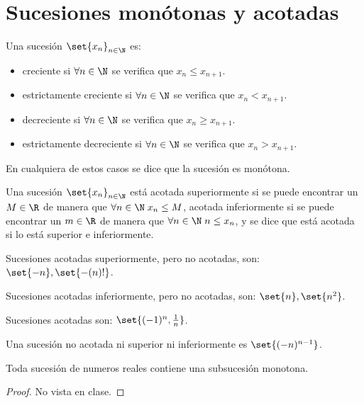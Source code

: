 \section{Sucesiones monótonas y acotadas}
\begin{definition}
	Una sucesión \(\set{x_n}_{n \in \N }\) es:
	\begin{itemize}
		\item creciente si \(\forall n \in \N \) se verifica que \(x_n \leq x_{n+1 }\).
		\item estrictamente creciente si \(\forall  n \in \N \) se verifica que \(x_n < x_{n+1}\).
		\item decreciente si \(\forall n \in \N \) se verifica que \(x_n \geq x_{n+1 }\).
		\item estrictamente decreciente si \(\forall n \in \N \) se verifica que \(x_n > x_{n+1}\).
	\end{itemize}
	En cualquiera de estos casos se dice que la sucesión es monótona.
\end{definition}

\begin{definition}
	Una sucesión \(\set{x_n}_{n \in \N }\) está acotada superiormente si se puede encontrar un \(M \in \R \) de manera que \(\forall n \in \N \; x_n \leq M \), acotada inferiormente si se puede encontrar un \(m \in \R \) de manera que \(\forall n \in \N \; n \leq x_n \), y se dice que está acotada si lo está superior e inferiormente.
\end{definition}
\begin{example}
	Sucesiones acotadas superiormente, pero no acotadas, son: \(\set{-n}, \set{-(n)! }\). 
	
	Sucesiones acotadas inferiormente, pero no acotadas, son: \(\set{n}, \set{n^{2}}\). 
	
	Sucesiones acotadas son: \(\set{(-1)^{n}, \frac{1}{n }}\). 
	
	Una sucesión no acotada ni superior ni inferiormente es \(\set{(-n)^{n-1}}\).
\end{example}
\begin{theorem}
	\label{submon}
	Toda sucesión de numeros reales contiene una subsucesión monotona.
\end{theorem}
\begin{proof}
	No vista en clase.
\end{proof}

